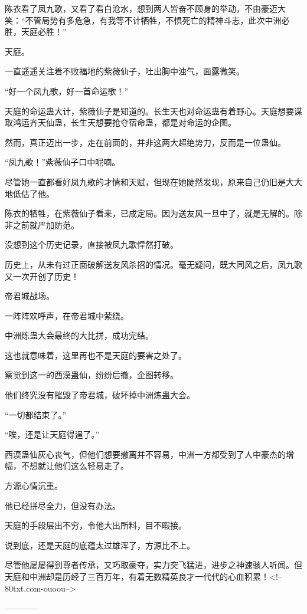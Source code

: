 \begin{this_body}
陈衣看了凤九歌，又看了看白沧水，想到两人皆奋不顾身的举动，不由豪迈大笑：“不管局势有多危急，有我等不计牺牲，不惧死亡的精神斗志，此次中洲必胜，天庭必胜！”

天庭。

一直遥遥关注着不败福地的紫薇仙子，吐出胸中浊气，面露微笑。

“好一个凤九歌，好一首命运歌！”

天庭的命运蛊大计，紫薇仙子是知道的。长生天也对命运蛊有着野心。天庭想要谋取鸿运齐天仙蛊，长生天想要抢夺宿命蛊，都是对命运的企图。

然而，真正迈出一步，走在前面的，并非这两大超绝势力，反而是一位蛊仙。

“凤九歌！”紫薇仙子口中呢喃。

尽管她一直都看好凤九歌的才情和天赋，但现在她陡然发现，原来自己仍旧是大大地低估了他。

陈衣的牺牲，在紫薇仙子看来，已成定局。因为送友风一旦中了，就是无解的。除非之前就严加防范。

没想到这个历史记录，直接被凤九歌悍然打破。

历史上，从未有过正面破解送友风杀招的情况。毫无疑问，既大同风之后，凤九歌又一次开创了历史！

帝君城战场。

一阵阵欢呼声，在帝君城中萦绕。

中洲炼蛊大会最终的大比拼，成功完结。

这也就意味着，这里再也不是天庭的要害之处了。

察觉到这一的西漠蛊仙，纷纷后撤，企图转移。

他们终究没有摧毁了帝君城，破坏掉中洲炼蛊大会。

“一切都结束了。”

“唉，还是让天庭得逞了。”

西漠蛊仙灰心丧气，但他们想要撤离并不容易，中洲一方都受到了人中豪杰的增幅，不想就让他们这么轻易走了。

方源心情沉重。

他已经拼尽全力，但没有办法。

天庭的手段层出不穷，令他大出所料，目不暇接。

说到底，还是天庭的底蕴太过雄浑了，方源比不上。

尽管他屡屡得到尊者传承，又巧取豪夺，实力突飞猛进，进步之神速骇人听闻。但天庭和中洲却是历经了三百万年，有着无数精英良才一代代的心血积累！<!--80txt.com-ouoou-->

------------

\end{this_body}

